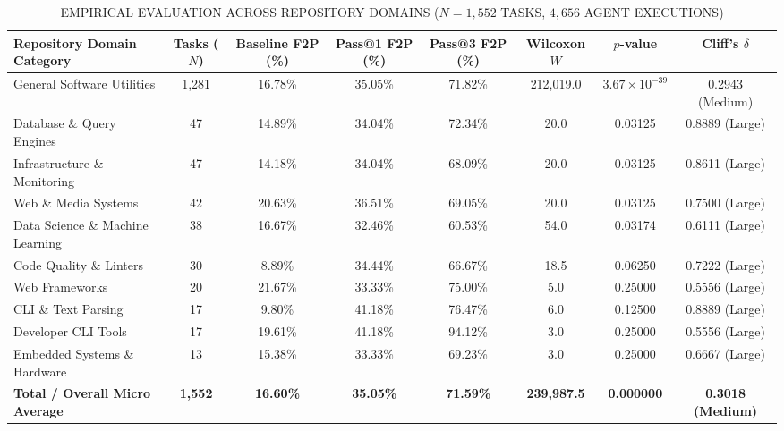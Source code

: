 \begin{table}[htbp]
\caption{EMPIRICAL EVALUATION ACROSS REPOSITORY DOMAINS ($N=1,552$ TASKS, $4,656$ AGENT EXECUTIONS)}
\begin{center}
\begin{tabular}{|l|c|c|c|c|c|c|c|}
\hline
\textbf{Repository Domain Category} & \textbf{Tasks ($N$)} & \textbf{Baseline F2P (\%)} & \textbf{Pass@1 F2P (\%)} & \textbf{Pass@3 F2P (\%)} & \textbf{Wilcoxon $W$} & \textbf{$p$-value} & \textbf{Cliff's $\delta$} \\
\hline
General Software Utilities & 1,281 & 16.78\% & 35.05\% & 71.82\% & 212,019.0 & $3.67 \times 10^{-39}$ & 0.2943 (Medium) \\
Database \& Query Engines & 47 & 14.89\% & 34.04\% & 72.34\% & 20.0 & 0.03125 & 0.8889 (Large) \\
Infrastructure \& Monitoring & 47 & 14.18\% & 34.04\% & 68.09\% & 20.0 & 0.03125 & 0.8611 (Large) \\
Web \& Media Systems & 42 & 20.63\% & 36.51\% & 69.05\% & 20.0 & 0.03125 & 0.7500 (Large) \\
Data Science \& Machine Learning & 38 & 16.67\% & 32.46\% & 60.53\% & 54.0 & 0.03174 & 0.6111 (Large) \\
Code Quality \& Linters & 30 & 8.89\% & 34.44\% & 66.67\% & 18.5 & 0.06250 & 0.7222 (Large) \\
Web Frameworks & 20 & 21.67\% & 33.33\% & 75.00\% & 5.0 & 0.25000 & 0.5556 (Large) \\
CLI \& Text Parsing & 17 & 9.80\% & 41.18\% & 76.47\% & 6.0 & 0.12500 & 0.8889 (Large) \\
Developer CLI Tools & 17 & 19.61\% & 41.18\% & 94.12\% & 3.0 & 0.25000 & 0.5556 (Large) \\
Embedded Systems \& Hardware & 13 & 15.38\% & 33.33\% & 69.23\% & 3.0 & 0.25000 & 0.6667 (Large) \\
\hline
\textbf{Total / Overall Micro Average} & \textbf{1,552} & \textbf{16.60\%} & \textbf{35.05\%} & \textbf{71.59\%} & \textbf{239,987.5} & \textbf{0.000000} & \textbf{0.3018 (Medium)} \\
\hline
\end{tabular}
\label{tab:domain_results}
\end{center}
\end{table}
